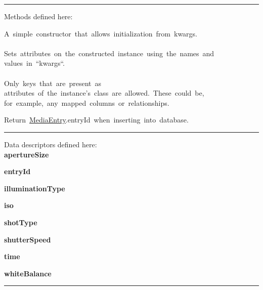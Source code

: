 \begin{longtable}[]
\begin{minipage}[t]{\linewidth}
\begin{longtable}[]
\begin{minipage}[t]{\linewidth}
\begin{center}\rule{0.5\linewidth}{0.5pt}\end{center}

Methods defined here:\\

\begin{description}
\tightlist
\item[\protect\hypertarget{MediaEntry-__init__}{}{\textbf{\_\_init\_\_}}(self,
**kwargs)]
{A~simple~constructor~that~allows~initialization~from~kwargs.\\
\hspace*{0.333em}\\
Sets~attributes~on~the~constructed~instance~using~the~names~and\\
values~in~``kwargs``.\\
\hspace*{0.333em}\\
Only~keys~that~are~present~as\\
attributes~of~the~instance's~class~are~allowed.~These~could~be,\\
for~example,~any~mapped~columns~or~relationships.}
\end{description}

\begin{description}
\tightlist
\item[\protect\hypertarget{MediaEntry-__repr__}{}{\textbf{\_\_repr\_\_}}(self)]
{Return~\protect\hyperlink{MediaEntry}{MediaEntry}.entryId~when~inserting~into~database.}
\end{description}

\begin{center}\rule{0.5\linewidth}{0.5pt}\end{center}

Data descriptors defined here:\\

\textbf{apertureSize}

\textbf{entryId}

\textbf{illuminationType}

\textbf{iso}

\textbf{shotType}

\textbf{shutterSpeed}

\textbf{time}

\textbf{whiteBalance}

\begin{center}\rule{0.5\linewidth}{0.5pt}\end{center}


\end{minipage}
\end{longtable}
\end{minipage}
\end{longtable}
